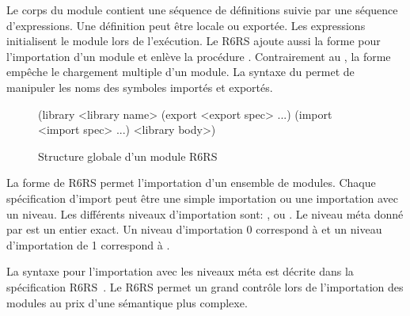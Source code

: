 Le corps du module contient une séquence de définitions suivie par une séquence
d'expressions. Une définition peut être locale ou exportée. Les expressions
initialisent le module lors de l'exécution.  Le R6RS ajoute aussi la forme
 pour l'importation d'un module et enlève la procédure
.  Contrairement au , la forme 
empêche le chargement multiple d'un module.  La syntaxe du 
permet de manipuler les noms des symboles importés et exportés.\\
\begin{figure}[ht]
  \begin{mplisting}{0.5}
(library <library name>
  (export <export spec> ...)
  (import <import spec> ...)
  <library body>)
\end{mplisting}
  \caption{Structure globale d'un module R6RS}
\end{figure}

La forme  de R6RS permet l'importation d'un ensemble de modules.
Chaque spécification d'import  peut être une simple
importation ou une importation avec un niveau. Les différents niveaux d'importation sont:
,  ou .  Le niveau méta
donné par  est un entier exact. Un niveau d'importation 0
correspond à  et un niveau d'importation de 1 correspond à
.



La syntaxe pour l'importation avec les niveaux méta est décrite dans la
spécification R6RS~\cite{Scheme:R6RS}. Le  R6RS permet un grand
contrôle lors de l'importation des modules au prix d'une sémantique plus complexe.

